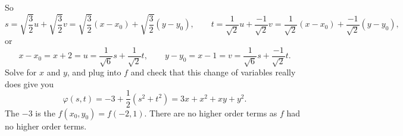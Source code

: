 \documentclass[12pt]{article}
\begin{document}
So
\begin{equation*}
s
=\sqrt{\frac{3}{2}} u +
\sqrt{\frac{3}{2}} v 
=\sqrt{\frac{3}{2}} (x-x_0) +
\sqrt{\frac{3}{2}} (y-y_0) , \qquad
t
= \frac{1}{\sqrt{2}} u + \frac{-1}{\sqrt{2}} v 
= \frac{1}{\sqrt{2}} (x-x_0) + \frac{-1}{\sqrt{2}} (y-y_0) ,
\end{equation*}
or
\begin{equation*}
x-x_0 = x+2 = u = 
\frac{1}{\sqrt{6}} s + 
\frac{1}{\sqrt{2}} t , \qquad
y-y_0 = x-1 = v = \frac{1}{\sqrt{6}} s + 
\frac{-1}{\sqrt{2}} t .
\end{equation*}
Solve for $x$ and $y$, and plug into $f$ and check that this change
of variables really does give you
\begin{equation*}
\varphi(s,t) = -3 + \frac{1}{2} ( s^2 + t^2 ) = 3x + x^2+xy+y^2 .
\end{equation*}
The $-3$ is the $f(x_0,y_0) = f(-2,1)$.  There are no higher order terms
as $f$ had no higher order terms.
\end{document}
